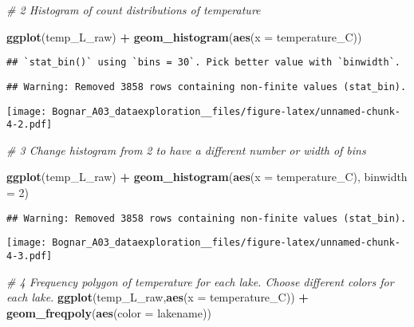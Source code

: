 \documentclass[]{article}
\newenvironment{Shaded}{\begin{snugshade}}{\end{snugshade}}
\newcommand{\KeywordTok}[1]{\textcolor[rgb]{0.13,0.29,0.53}{\textbf{#1}}}
\newcommand{\DataTypeTok}[1]{\textcolor[rgb]{0.13,0.29,0.53}{#1}}
\newcommand{\DecValTok}[1]{\textcolor[rgb]{0.00,0.00,0.81}{#1}}
\newcommand{\StringTok}[1]{\textcolor[rgb]{0.31,0.60,0.02}{#1}}
\newcommand{\CommentTok}[1]{\textcolor[rgb]{0.56,0.35,0.01}{\textit{#1}}}
\newcommand{\OperatorTok}[1]{\textcolor[rgb]{0.81,0.36,0.00}{\textbf{#1}}}
\newcommand{\NormalTok}[1]{#1}
\begin{document}
\begin{Shaded}
\begin{Highlighting}[]
\CommentTok{# 2 Histogram of count distributions of temperature}

\KeywordTok{ggplot}\NormalTok{(temp_L_raw) }\OperatorTok{+}
\StringTok{  }\KeywordTok{geom_histogram}\NormalTok{(}\KeywordTok{aes}\NormalTok{(}\DataTypeTok{x =}\NormalTok{ temperature_C))}
\end{Highlighting}
\end{Shaded}

\begin{verbatim}
## `stat_bin()` using `bins = 30`. Pick better value with `binwidth`.
\end{verbatim}

\begin{verbatim}
## Warning: Removed 3858 rows containing non-finite values (stat_bin).
\end{verbatim}

\texttt{[image: Bognar\_A03\_dataexploration\_\_files/figure-latex/unnamed-chunk-4-2.pdf]}

\begin{Shaded}
\begin{Highlighting}[]
\CommentTok{# 3 Change histogram from 2 to have a different number or width of bins}

\KeywordTok{ggplot}\NormalTok{(temp_L_raw) }\OperatorTok{+}
\StringTok{  }\KeywordTok{geom_histogram}\NormalTok{(}\KeywordTok{aes}\NormalTok{(}\DataTypeTok{x =}\NormalTok{ temperature_C), }\DataTypeTok{binwidth =} \DecValTok{2}\NormalTok{)}
\end{Highlighting}
\end{Shaded}

\begin{verbatim}
## Warning: Removed 3858 rows containing non-finite values (stat_bin).
\end{verbatim}

\texttt{[image: Bognar\_A03\_dataexploration\_\_files/figure-latex/unnamed-chunk-4-3.pdf]}

\begin{Shaded}
\begin{Highlighting}[]
\CommentTok{# 4 Frequency polygon of temperature for each lake. Choose different colors for each lake.}
\KeywordTok{ggplot}\NormalTok{(temp_L_raw,}\KeywordTok{aes}\NormalTok{(}\DataTypeTok{x =}\NormalTok{ temperature_C)) }\OperatorTok{+}
\StringTok{  }\KeywordTok{geom_freqpoly}\NormalTok{(}\KeywordTok{aes}\NormalTok{(}\DataTypeTok{color =}\NormalTok{ lakename))}
\end{Highlighting}
\end{Shaded}
\end{document}
